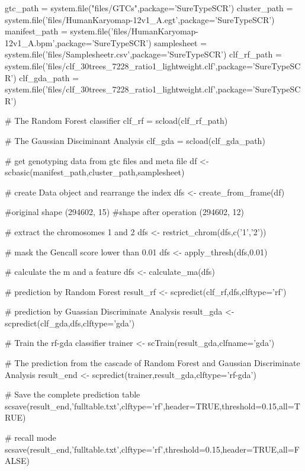 \documentclass[a4paper]{book}
\begin{document}
\begin{Examples}
\begin{ExampleCode}

gtc_path = system.file("files/GTCs",package='SureTypeSCR')
cluster_path = system.file('files/HumanKaryomap-12v1_A.egt',package='SureTypeSCR')
manifest_path = system.file('files/HumanKaryomap-12v1_A.bpm',package='SureTypeSCR')
samplesheet = system.file('files/Samplesheetr.csv',package='SureTypeSCR')
clf_rf_path = system.file('files/clf_30trees_7228_ratio1_lightweight.clf',package='SureTypeSCR')
clf_gda_path = system.file('files/clf_30trees_7228_ratio1_lightweight.clf',package='SureTypeSCR')


# The Random Forest classifier
clf_rf = scload(clf_rf_path) 

# The Gaussian Disciminant Analysis
clf_gda = scload(clf_gda_path) 

# get genotyping data from gtc files and meta file
df <- scbasic(manifest_path,cluster_path,samplesheet)  

# create Data object and rearrange the index
dfs <- create_from_frame(df) 


#original shape (294602, 15)
#shape after operation (294602, 12)



# extract the chromosomes 1 and 2
dfs <- restrict_chrom(dfs,c('1','2')) 

# mask the Gencall score lower than 0.01
dfs <- apply_thresh(dfs,0.01) 

# calculate the m and a feature
dfs <- calculate_ma(dfs) 

# prediction by Random Forest
result_rf <- scpredict(clf_rf,dfs,clftype='rf')

# prediction by Guassian Discriminate Analysis
result_gda <- scpredict(clf_gda,dfs,clftype='gda')

# Train the rf-gda classifier
trainer <- scTrain(result_gda,clfname='gda') 

# The prediction from the cascade of Random Forest and Gaussian Discriminate Analysis
result_end <- scpredict(trainer,result_gda,clftype='rf-gda') 

# Save the complete prediction table
scsave(result_end,'fulltable.txt',clftype='rf',header=TRUE,threshold=0.15,all=TRUE)

# recall mode
scsave(result_end,'fulltable.txt',clftype='rf',threshold=0.15,header=TRUE,all=FALSE)
 


\end{ExampleCode}
\end{Examples}
\end{document}
